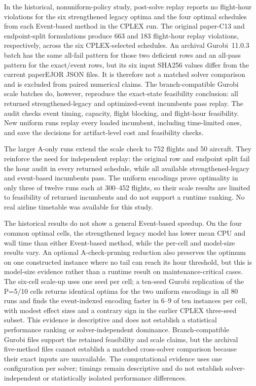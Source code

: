 In the historical, nonuniform-policy study, post-solve replay reports no
flight-hour violations for the six
strengthened legacy optima and the four optimal schedules from each Event-based
method in the CPLEX run. The original paper-C13 and endpoint-split
formulations produce 663 and 183 flight-hour replay violations, respectively,
across the six CPLEX-selected schedules. An archival Gurobi~11.0.3 batch has
the same all-fail pattern for those two deficient rows and an all-pass pattern
for the exact/event rows, but its six input SHA256 values differ from the
current paperEJOR JSON files. It is therefore not a matched solver comparison
and is excluded from paired numerical claims. The branch-compatible Gurobi
scale batches do, however, reproduce the exact-state feasibility conclusion:
all returned strengthened-legacy and optimized-event incumbents pass replay.
The audit checks event timing, capacity, flight blocking, and flight-hour
feasibility. New uniform runs replay every loaded incumbent, including
time-limited ones, and save the decisions for artifact-level cost and
feasibility checks.

The larger A-only runs extend the scale check to 752 flights and 50 aircraft.
They reinforce the need for independent replay: the original row and endpoint
split fail the hour audit in every returned schedule, while all available
strengthened-legacy and event-based incumbents pass. The uniform encodings
prove optimality in only three of twelve runs each at 300--452 flights, so
their scale results are limited to feasibility of returned incumbents and do
not support a runtime ranking. No real airline timetable was available for
this study.

The historical results do not show a general Event-based speedup. On the four common
optimal cells, the strengthened legacy model has lower mean CPU and wall time
than either Event-based method, while the per-cell and model-size results vary.
An optional A-check-pruning reduction also preserves the optimum on one
constructed instance where no tail can reach its hour threshold, but this is
model-size evidence rather than a runtime result on maintenance-critical cases.
The six-cell scale-up uses one seed per cell; a ten-seed Gurobi replication of
the P=5/10 cells returns identical optima for the two uniform encodings in all
80 runs and finds the event-indexed encoding faster in 6--9 of ten instances
per cell, with modest effect sizes and a contrary sign in the earlier CPLEX
three-seed subset. This evidence is descriptive and does not
establish a statistical performance ranking or solver-independent dominance.
Branch-compatible Gurobi files support the retained feasibility and scale
claims, but the archival five-method files cannot establish a matched
cross-solver comparison because their exact inputs are unavailable. The
computational evidence uses one configuration per solver; timings remain
descriptive and do not establish solver-independent or statistically isolated
performance differences.

